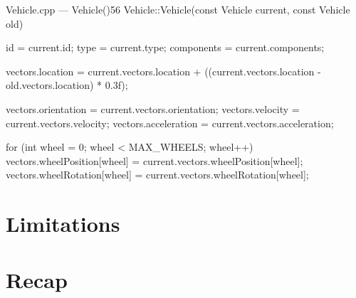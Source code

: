 \begin{codelist}{Vehicle.cpp --- Vehicle()}{56}
Vehicle::Vehicle(const Vehicle current, const Vehicle old) {
    id         = current.id;
    type       = current.type;
    components = current.components;

    vectors.location = current.vectors.location + ((current.vectors.location - old.vectors.location) * 0.3f);

    vectors.orientation  = current.vectors.orientation;
    vectors.velocity     = current.vectors.velocity;
    vectors.acceleration = current.vectors.acceleration;

    for (int wheel = 0; wheel < MAX_WHEELS; wheel++) {
        vectors.wheelPosition[wheel] = current.vectors.wheelPosition[wheel];
        vectors.wheelRotation[wheel] = current.vectors.wheelRotation[wheel];
    }
}
\end{codelist}

\section{Limitations}\label{sc:integration:limitations}

\section{Recap}\label{sc:integration:recap}
